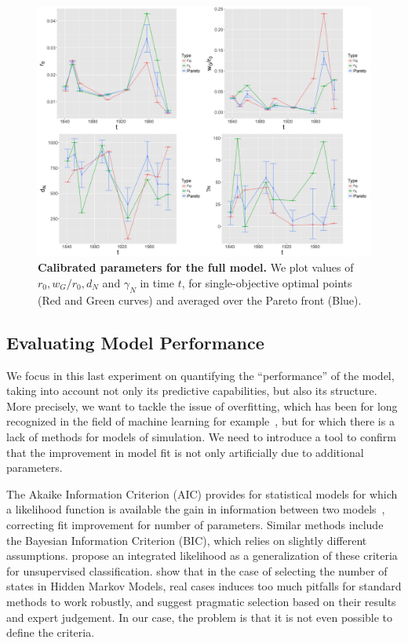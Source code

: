 \documentclass{article}
\begin{document}
\begin{figure}
\centering
\includegraphics[width=\textwidth]{Fig6}
\caption{\textbf{Calibrated parameters for the full model.} We plot values of $r_0, w_G/r_0, d_N$ and $\gamma_N$ in time $t$, for single-objective optimal points (Red and Green curves) and averaged over the Pareto front (Blue).}
\label{fig:feedback}
\end{figure}







\subsection*{Evaluating Model Performance}

We focus in this last experiment on quantifying the ``performance'' of the model, taking into account not only its predictive capabilities, but also its structure. More precisely, we want to tackle the issue of overfitting, which has been for long recognized in the field of machine learning for example~\citep{dietterich1995overfitting}, but for which there is a lack of methods for models of simulation. We need to introduce a tool to confirm that the improvement in model fit is not only artificially due to additional parameters.

The Akaike Information Criterion (AIC) provides for statistical models for which a likelihood function is available the gain in information between two models~\citep{akaike1998information}, correcting fit improvement for number of parameters. Similar methods include the Bayesian Information Criterion (BIC), which relies on slightly different assumptions. \cite{biernacki2000assessing} propose an integrated likelihood as a generalization of these criteria for unsupervised classification. \cite{2017arXiv170108673P} show that in the case of selecting the number of states in Hidden Markov Models, real cases induces too much pitfalls for standard methods to work robustly, and suggest pragmatic selection based on their results and expert judgement. In our case, the problem is that it is not even possible to define the criteria.
\end{document}
